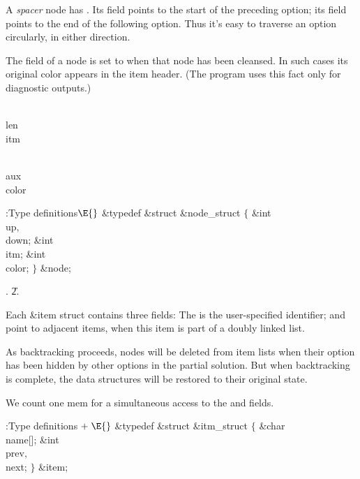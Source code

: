 A {\it spacer\/} node has . Its  field points
to the start
of the preceding option; its  field points to the end of the
following option.
Thus it's easy to traverse an option circularly, in either direction.

The  field of a node is set to  when that node has
been cleansed.
In such cases its original color appears in the item header.
(The program uses this fact only for diagnostic outputs.)

\Y\B\4\D\\{len}\5
\\{itm}\par
\B\4\D\\{aux}\5
\\{color}\par
\Y\B\4:Type definitions\X${}\E{}$\6
\&{typedef} \&{struct} \&{node\_struct} ${}\{{}$\1\6
\&{int} \\{up}${},{}$ \\{down};\6
\&{int} \\{itm};\6
\&{int} \\{color};\2\6
${}\}{}$ \&{node};\par
{}.
\U2.\fi

Each \&{item} struct contains three fields:
The  is the user-specified identifier;
 and  point to adjacent items, when this
item is part of a doubly linked list.

As backtracking proceeds, nodes
will be deleted from item lists when their option has been hidden by
other options in the partial solution.
But when backtracking is complete, the data structures will be
restored to their original state.

We count one mem for a simultaneous access to the  and  fields.

\Y\B\4:Type definitions\X${}\mathrel+\E{}$\6
\&{typedef} \&{struct} \&{itm\_struct} ${}\{{}$\1\6
\&{char} \\{name}[];\6
\&{int} \\{prev}${},{}$ \\{next};\2\6
${}\}{}$ \&{item};\par
\fi

